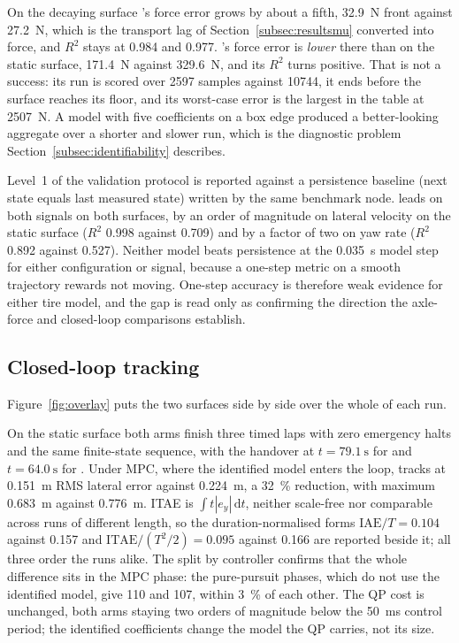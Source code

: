On the decaying surface \oursarm{}'s force error grows by about a fifth,
\SI{32.9}{\newton} front against \SI{27.2}{\newton}, which is the transport lag
of Section~\ref{subsec:resultsmu} converted into force, and $R^{2}$ stays at
\num{0.984} and \num{0.977}. \basearm{}'s force error is \emph{lower} there than
on the static surface, \SI{171.4}{\newton} against \SI{329.6}{\newton}, and its
$R^{2}$ turns positive. That is not a success: its run is scored over \num{2597}
samples against \num{10744}, it ends before the surface reaches its floor, and
its worst-case error is the largest in the table at \SI{2507}{\newton}. A model
with five coefficients on a box edge produced a better-looking aggregate over a
shorter and slower run, which is the diagnostic problem
Section~\ref{subsec:identifiability} describes.

Level~1 of the validation protocol is reported against a persistence baseline
(next state equals last measured state) written by the same benchmark node.
\oursarm{} leads on both signals on both surfaces, by an order of magnitude on
lateral velocity on the static surface ($R^{2}$ \num{0.998} against
\num{0.709}) and by a factor of two on yaw rate ($R^{2}$ \num{0.892} against
\num{0.527}). Neither model beats persistence at the \SI{0.035}{\second} model
step for either configuration or signal, because a one-step metric on a smooth
trajectory rewards not moving. One-step accuracy is therefore weak evidence for
either tire model, and the gap is read only as confirming the direction the
axle-force and closed-loop comparisons establish.

\subsection{Closed-loop tracking}
\label{subsec:resultsclosedloop}

Figure~\ref{fig:overlay} puts the two surfaces side by side over the whole of
each run.

On the static surface both arms finish three timed laps with zero emergency
halts and the same finite-state sequence, with the handover at
$t=\SI{79.1}{\second}$ for \oursarm{} and $t=\SI{64.0}{\second}$ for
\basearm{}. Under MPC, where the identified model enters the loop, \oursarm{}
tracks at \SI{0.151}{\meter} RMS lateral error against \SI{0.224}{\meter}, a
\SI{32}{\percent} reduction, with maximum \SI{0.683}{\meter} against
\SI{0.776}{\meter}. ITAE is $\int t|e_{y}|\,\mathrm{d}t$, neither scale-free
nor comparable across runs of different length, so the duration-normalised
forms $\mathrm{IAE}/T=\num{0.104}$ against \num{0.157} and
$\mathrm{ITAE}/(T^{2}/2)=\num{0.095}$ against \num{0.166} are reported beside
it; all three order the runs alike. The split by controller confirms that the
whole difference sits in the MPC phase: the pure-pursuit phases, which do not
use the identified model, give \num{110} and \num{107}, within
\SI{3}{\percent} of each other. The QP cost is unchanged, both arms staying two
orders of magnitude below the \SI{50}{\milli\second} control period; the
identified coefficients change the model the QP carries, not its size.

